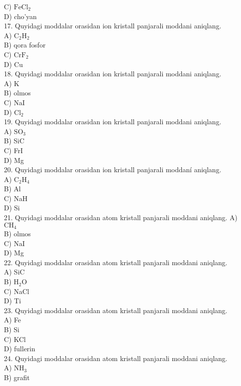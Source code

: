 C) $\mathrm{FeCl}_{2}$\\
D) cho'yan\\
17. Quyidagi moddalar orasidan ion kristall panjarali moddani aniqlang.\\
A) $\mathrm{C}_{2} \mathrm{H}_{2}$\\
B) qora fosfor\\
C) $\mathrm{CrF}_{2}$\\
D) Cu\\
18. Quyidagi moddalar orasidan ion kristall panjarali moddani aniqlang.\\
A) K\\
B) olmos\\
C) NaI\\
D) $\mathrm{Cl}_{2}$\\
19. Quyidagi moddalar orasidan ion kristall panjarali moddani aniqlang.\\
A) $\mathrm{SO}_{3}$\\
B) SiC\\
C) FrI\\
D) Mg\\
20. Quyidagi moddalar orasidan ion kristall panjarali moddaní aniqlang.\\
A) $\mathrm{C}_{2} \mathrm{H}_{4}$\\
B) Al\\
C) NaH\\
D) Si\\
21. Quyidagi moddalar orasidan atom kristall panjarali moddani aniqlang. 
A) $\mathrm{CH}_{4}$\\
B) olmos\\
C) NaI\\
D) Mg\\
22. Quyidagi moddalar orasidan atom kristall panjarali moddani aniqlang.\\
A) SiC\\
B) $\mathrm{H}_{2} \mathrm{O}$\\
C) NaCl\\
D) Ti\\
23. Quyidagi moddalar orasidan atom kristall panjarali moddani aniqlang.\\
A) Fe\\
B) Si\\
C) KCl\\
D) fullerin\\
24. Quyidagi moddalar orasidan atom kristall panjarali moddani aniqlang.\\
A) $\mathrm{NH}_{3}$\\
B) grafit\\
